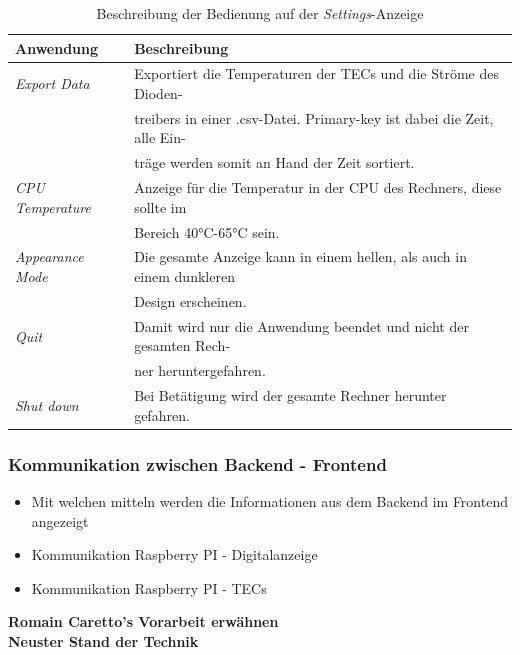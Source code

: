 \begin{table}[H]
    \centering
    \begin{tabular}{l|l}
         \textbf{Anwendung}&        \textbf{Beschreibung}\\
         \hline
         \textit{Export Data}&      Exportiert die Temperaturen der TECs und die Ströme des Dioden-\\
         &                          treibers in einer .csv-Datei. Primary-key ist dabei die Zeit, alle Ein-\\
         &                          träge werden somit an Hand der Zeit sortiert.\\
         \textit{CPU Temperature}&  Anzeige für die Temperatur in der CPU des Rechners, diese sollte im\\
         &                          Bereich 40°C-65°C sein.\\
         \textit{Appearance Mode}&  Die gesamte Anzeige kann in einem hellen, als auch in einem dunkleren\\
         &                          Design erscheinen.\\
         \textit{Quit}&             Damit wird nur die Anwendung beendet und nicht der gesamten Rech-\\
         &                          ner heruntergefahren.\\
         \textit{Shut down}&        Bei Betätigung wird der gesamte Rechner herunter gefahren.
    \end{tabular}
    \caption{Beschreibung der Bedienung auf der \textit{Settings}-Anzeige}
    \label{tab:settings_beschriebung_sw}
\end{table}

\subsubsection{Kommunikation zwischen Backend - Frontend}

\begin{itemize}
    \item Mit welchen mitteln werden die Informationen aus dem Backend im Frontend angezeigt
    \item Kommunikation Raspberry PI - Digitalanzeige
    \item Kommunikation Raspberry PI - TECs
\end{itemize}

\textbf{Romain Caretto's Vorarbeit erwähnen}\\
\textbf{Neuster Stand der Technik}

